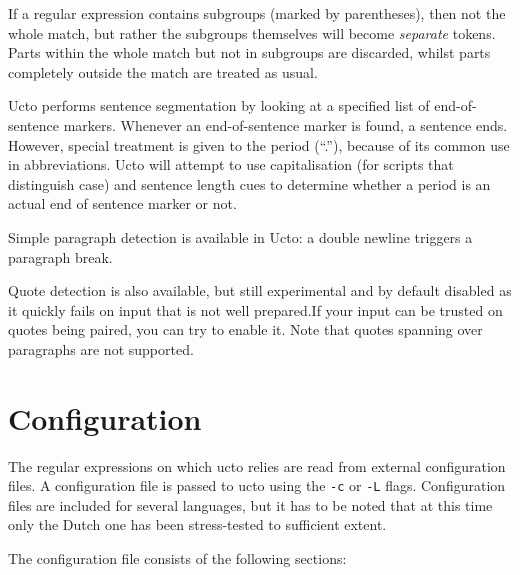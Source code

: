 \documentclass[a4paper,12pt]{report}
\begin{document}
If a regular expression contains subgroups (marked by parentheses), then not the whole match, but rather the subgroups themselves will become \emph{separate} tokens. Parts within the whole match but not in subgroups are discarded, whilst parts completely outside the match are treated as usual.

Ucto performs sentence segmentation by looking at a specified list of end-of-sentence markers. Whenever an end-of-sentence marker is found, a sentence ends. However, special treatment is given to the period (``.''), because of its common use in abbreviations. Ucto will attempt to use capitalisation (for scripts that distinguish case) and sentence length cues to determine whether a period is an actual end of sentence marker or not.

Simple paragraph detection is available in Ucto: a double newline triggers a paragraph break.

Quote detection is also available, but still experimental and by default disabled as it quickly fails on input that is not well prepared.If your input can be trusted on quotes being paired, you can try to enable it.  Note that quotes spanning over paragraphs are not supported.

\section{Configuration}

The regular expressions on which ucto relies are read from external configuration files. A configuration file is passed to ucto using the \texttt{-c} or \texttt{-L} flags. Configuration files are included for several languages, but it has to be noted that at this time only the Dutch one has been stress-tested to sufficient extent.

The configuration file consists of the following sections:
\end{document}
